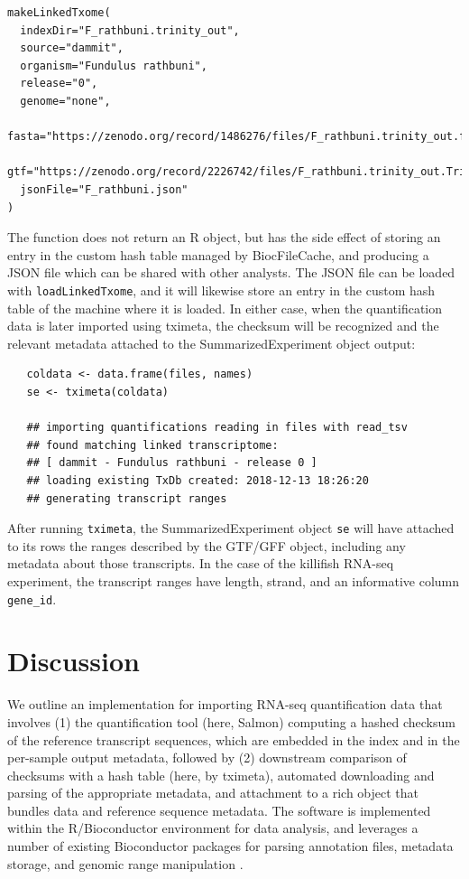 \documentclass[12pt]{article} \usepackage[utf8]{inputenc}
\begin{document}
\begin{lstlisting}
makeLinkedTxome(
  indexDir="F_rathbuni.trinity_out", 
  source="dammit",
  organism="Fundulus rathbuni", 
  release="0", 
  genome="none",
  fasta="https://zenodo.org/record/1486276/files/F_rathbuni.trinity_out.fasta",
  gtf="https://zenodo.org/record/2226742/files/F_rathbuni.trinity_out.Trinity.fasta.dammit.gff3",
  jsonFile="F_rathbuni.json"
)
\end{lstlisting}

The function does not return an R object, but has the side effect of
storing an entry in the custom hash table managed by BiocFileCache,
and producing a JSON file which can be shared with other analysts. The
JSON file can be loaded with \texttt{loadLinkedTxome}, and it will
likewise store an entry in the custom hash table of the machine where
it is loaded. In either case, when the quantification data is later
imported using tximeta, the checksum will be recognized and the
relevant metadata attached to the SummarizedExperiment object output:

\begin{verbatim}
   coldata <- data.frame(files, names) 
   se <- tximeta(coldata)

   ## importing quantifications reading in files with read_tsv
   ## found matching linked transcriptome: 
   ## [ dammit - Fundulus rathbuni - release 0 ] 
   ## loading existing TxDb created: 2018-12-13 18:26:20 
   ## generating transcript ranges
\end{verbatim}

After running \texttt{tximeta}, the SummarizedExperiment object
\texttt{se} will have attached to its rows the ranges described by the
GTF/GFF object, including any metadata about those transcripts. In the
case of the killifish RNA-seq experiment, the transcript ranges have
length, strand, and an informative column \texttt{gene\_id}.

\section*{Discussion}

We outline an implementation for importing RNA-seq quantification
data that involves (1) the quantification tool (here, Salmon)
computing a hashed checksum of the reference transcript sequences,
which are embedded in the index and in the per-sample output metadata,
followed by (2) downstream comparison of checksums with a hash table
(here, by tximeta), automated downloading and parsing of the
appropriate metadata, and attachment to a rich object that bundles
data and reference sequence metadata. The software is implemented
within the R/Bioconductor environment for data analysis, and leverages
a number of existing Bioconductor packages for parsing annotation
files, metadata storage, and genomic range manipulation
\citep{bioc,ensembldb,biocfilecache,granges}.
\end{document}

